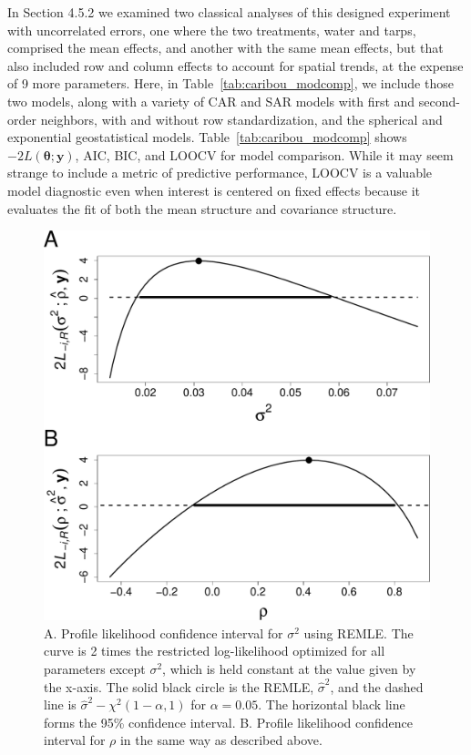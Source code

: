 \documentclass[12pt, titlepage]{article}
\begin{document}
In Section 4.5.2 we examined two classical analyses of this designed experiment with uncorrelated errors, one where the two treatments, water and tarps, comprised the mean effects, and another with the same mean effects, but that also included row and column effects to account for spatial trends, at the expense of 9 more parameters.  Here, in Table~\ref{tab:caribou_modcomp}, we include those two models, along with a variety of CAR and SAR models with first and second-order neighbors, with and without row standardization, and the spherical and exponential geostatistical models. Table~\ref{tab:caribou_modcomp} shows $-2L(\boldsymbol{\theta};\mathbf{y})$, AIC, BIC, and LOOCV for model comparison.  While it may seem strange to include a metric of predictive performance, LOOCV is a valuable model diagnostic even when interest is centered on fixed effects because it evaluates the fit of both the mean structure and covariance structure.

\begin{figure}[H]
  \begin{center}
	    \includegraphics[width=.6\linewidth]{Caribou_proflike}
  \end{center}
  \caption{A. Profile likelihood confidence interval for $\sigma^{2}$ using REMLE. The curve is 2 times the restricted log-likelihood optimized for all parameters except $\sigma^{2}$, which is held constant at the value given by the x-axis.  The solid black circle is the REMLE, $\hat{\sigma}^{2}$, and the dashed line is $\hat{\sigma}^{2} - \chi^{2}(1-\alpha,1)$ for $\alpha = 0.05$.  The horizontal black line forms the 95\% confidence interval.  B. Profile likelihood confidence interval for $\rho$ in the same way as described above.  \label{Fig:Caribou_proflike}}
\end{figure}
\end{document}
